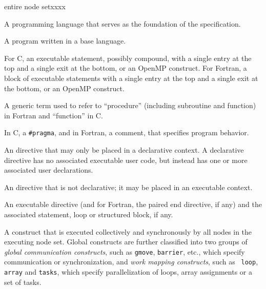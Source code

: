 \begin{namelist}{entire node setxxxx}


 A programming language that serves as the foundation of the {\XMP}
 specification.


 A program written in a base language.


 For C, an executable statement, possibly compound, with a single entry
 at the top and a single exit at the bottom, or an OpenMP construct.
 For Fortran, a block of executable statements with a single entry at
 the top and a single exit at the bottom, or an OpenMP construct.


 A generic term used to refer to ``procedure'' (including subroutine and
 function) in Fortran and ``function'' in C.


 In C, a {\tt \#pragma}, and in Fortran, a comment, that specifies
 {\XMP} program behavior.


 An {\XMP} directive that may only be placed in a declarative context. A
 declarative directive has no associated executable user code, but
 instead has one or more associated user declarations.


 An {\XMP} directive that is not declarative; it may be placed in an
 executable context.


 An {\XMP} executable directive (and for Fortran, the paired end
 directive, if any) and the associated statement, loop or structured
 block, if any.



 A construct that is executed collectively and synchronously by all
 nodes in the executing node set. Global constructs are further
 classified into two groups of {\it global communication constructs},
 such as {\tt gmove}, {\tt barrier}, etc., which specify communication
 or synchronization, and {\it work mapping constructs}, such as {\tt
 loop}, {\tt array} and {\tt tasks}, which specify parallelization of
 loops, array assignments or a set of tasks.


\end{namelist}
